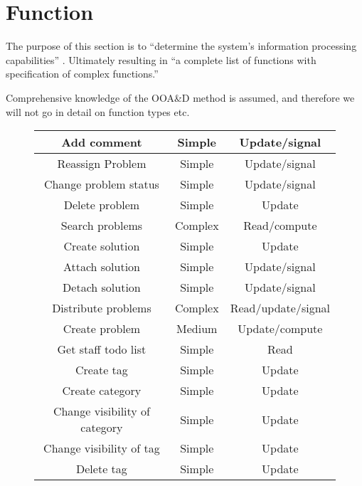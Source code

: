 \section{Function}
\label{sec:function}

The purpose of this section is to ``determine the system's information processing capabilities'' \cite[p.~137]{roedeaalborg}. Ultimately resulting in ``a complete list of functions with specification of complex functions.'' \cite[p.~137]{roedeaalborg}

Comprehensive knowledge of the OOA\&D method is assumed, and therefore we will not go in detail on function types etc. 

\begin{figure}[h] %
\begin{center}
\begin{tabular}{|c|c|c|}
\hline
Add comment &   Simple & Update/signal   \\ \hline%
Reassign Problem & Simple   & Update/signal \\ \hline%
Change problem status &   Simple & Update/signal \\ \hline%
Delete problem & Simple &   Update \\   \hline%
Search problems & Complex &   Read/compute \\ \hline%
Create solution & Simple &   Update \\   \hline%
Attach solution & Simple &   Update/signal \\   \hline%
Detach solution & Simple &   Update/signal \\   \hline%
Distribute problems &   Complex & Read/update/signal \\   \hline%
Create problem & Medium & Update/compute \\   \hline%
Get staff todo list & Simple & Read \\   \hline%
Create tag & Simple &   Update \\ \hline%
Create category & Simple & Update \\ \hline%
Change visibility of category &   Simple &   Update \\   \hline%
Change visibility of tag &   Simple &  Update \\ \hline%
Delete tag & Simple &   Update \\ \hline%

\end{tabular}
\end{center}
\end{figure}
